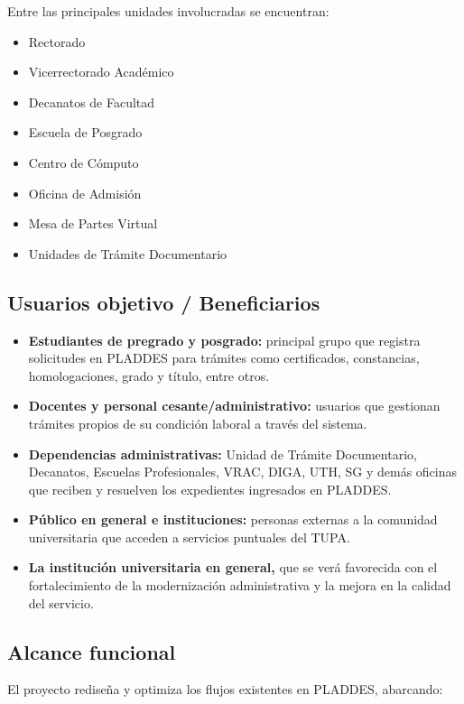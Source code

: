 Entre las principales unidades involucradas se encuentran:
 
\begin{itemize}[noitemsep]
    \item Rectorado
    \item Vicerrectorado Académico
    \item Decanatos de Facultad
    \item Escuela de Posgrado
    \item Centro de Cómputo
    \item Oficina de Admisión
    \item Mesa de Partes Virtual
    \item Unidades de Trámite Documentario
\end{itemize}
 
\subsection{Usuarios objetivo / Beneficiarios}
 
\begin{itemize}
    \item \textbf{Estudiantes de pregrado y posgrado:} principal grupo que registra solicitudes en PLADDES para trámites como certificados, constancias, homologaciones, grado y título, entre otros.
    \item \textbf{Docentes y personal cesante/administrativo:} usuarios que gestionan trámites propios de su condición laboral a través del sistema.
    \item \textbf{Dependencias administrativas:} Unidad de Trámite Documentario, Decanatos, Escuelas Profesionales, VRAC, DIGA, UTH, SG y demás oficinas que reciben y resuelven los expedientes ingresados en PLADDES.
    \item \textbf{Público en general e instituciones:} personas externas a la comunidad universitaria que acceden a servicios puntuales del TUPA.
    \item \textbf{La institución universitaria en general,} que se verá favorecida con el fortalecimiento de la modernización administrativa y la mejora en la calidad del servicio.
\end{itemize}
 
\subsection{Alcance funcional}
 
El proyecto rediseña y optimiza los flujos existentes en PLADDES, abarcando:
 
